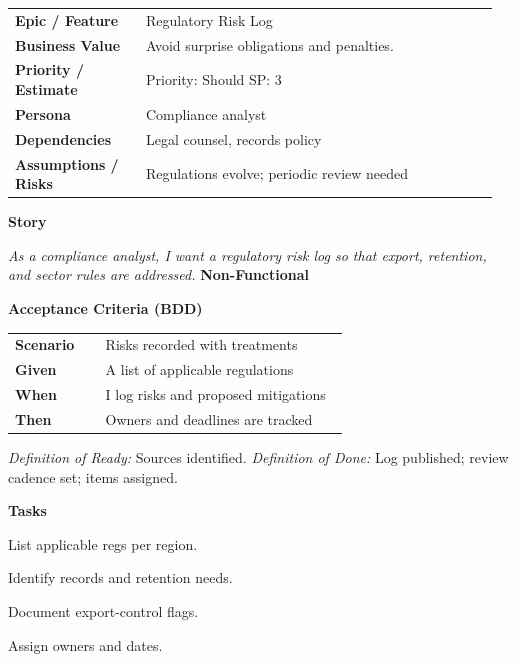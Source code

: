 \documentclass[11pt,letterpaper]{article}
\makeatletter
\newenvironment{kvtable}{%
  \begin{tabular}{@{}>{\bfseries\arraybackslash}p{0.26\linewidth} p{0.70\linewidth}@{}}
}{\end{tabular}}
\newenvironment{bdd}{%
  \begin{tabular}{@{}>{\bfseries\arraybackslash}p{0.26\linewidth} p{0.70\linewidth}@{}}
}{\end{tabular}}
\newcommand{\DoRDoD}[2]{%
  \vspace{0.35em}
  {\footnotesize\color{Muted}%
    \textit{Definition of Ready:} #1 \; \textbullet\;
    \textit{Definition of Done:} #2%
  }%
}
\newenvironment{storycard}[2]{%
  \begin{tcolorbox}[cloudcard, title={#1 --- #2}]%
}{\end{tcolorbox}}
\newcommand{\sectionlabel}[1]{\vspace{0.35em}\textbf{#1}\par}
\makeatother
\begin{document}
\begin{storycard}{CCS-28}{Ch. 28 — Government Regulations \& Compliance Risks}
\begin{kvtable}
Epic / Feature & Regulatory Risk Log\\
Business Value & Avoid surprise obligations and penalties.\\
Priority / Estimate & Priority: Should \quad SP: 3\\
Persona & Compliance analyst\\
Dependencies & Legal counsel, records policy\\
Assumptions / Risks & Regulations evolve; periodic review needed\\
\end{kvtable}
\sectionlabel{Story}
\textit{As a compliance analyst, I want a regulatory risk log so that export, retention, and sector rules are addressed.}
\sectionlabel{Non-Functional}\;
\sectionlabel{Acceptance Criteria (BDD)}
\begin{bdd}
Scenario & Risks recorded with treatments\\
Given & A list of applicable regulations\\
When & I log risks and proposed mitigations\\
Then & Owners and deadlines are tracked\\
\end{bdd}
\DoRDoD{Sources identified.}{Log published; review cadence set; items assigned.}
\sectionlabel{Tasks}
\begin{checklist}
\item List applicable regs per region.
\item Identify records and retention needs.
\item Document export-control flags.
\item Assign owners and dates.
\end{checklist}
\end{storycard}
\end{document}
